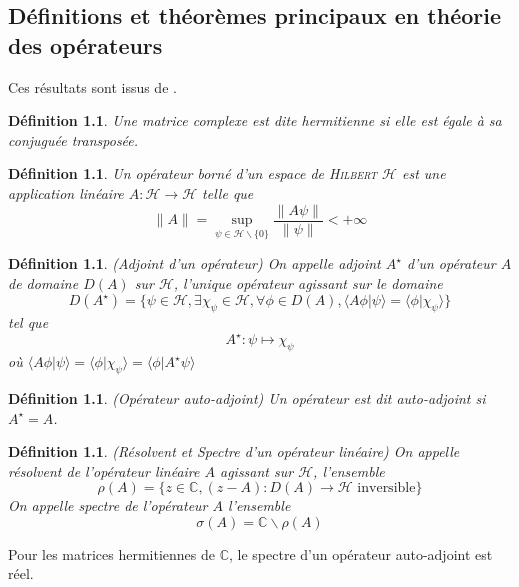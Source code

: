 \documentclass[svgnames,dvipsnames,a4paper,10pt,french]{report}
\newtheorem{definition}[theorem]{Définition}
\begin{document}
\begin{appendices}
\chapter{Définitions et théorèmes principaux en théorie des opérateurs}
\label{ann:def_th_op}


Ces résultats sont issus de \cite{cances_introduction_2021}.
\begin{definition}
Une matrice complexe est dite hermitienne si elle est égale à sa conjuguée transposée.
\end{definition}

\begin{definition}
Un opérateur borné d'un espace de \textsc{Hilbert} $\mathcal{H}$ est une application linéaire $A:\mathcal{H}\rightarrow\mathcal{H}$ telle que
\begin{equation}
\|A\| = \sup_{\psi\in\mathcal{H} \backslash  \{0\}} \frac{\|A\psi\|}{\|\psi\|} <+\infty
\end{equation}
\end{definition}

\begin{definition}{(Adjoint d'un opérateur)}
On appelle adjoint $A^\star$ d'un opérateur $A$ de domaine $D(A)$ sur $\mathcal{H}$, l'unique opérateur agissant  sur le domaine
\begin{equation}
    D(A^\star) = \{\psi\in\mathcal{H},\exists \chi_{\psi}\in\mathcal{H},\forall \phi \in D(A), \langle A\phi|\psi\rangle = \langle \phi|\chi_\psi\rangle \}
\end{equation}
tel que 
\begin{equation}
    A^\star:\psi \mapsto \chi_\psi
\end{equation}
où $\langle A\phi|\psi\rangle = \langle \phi|\chi_\psi\rangle = \langle \phi |A^\star \psi \rangle$
\end{definition}

\begin{definition}{(Opérateur auto-adjoint)}
Un opérateur est dit auto-adjoint si $A^\star =A$.
\end{definition}

\begin{definition}{(Résolvent et Spectre d'un opérateur linéaire)}
On appelle résolvent de l'opérateur linéaire $A$ agissant sur $\mathcal{H}$, l'ensemble
\begin{equation}
    \rho (A) = \{z\in\mathbb{C}, (z-A):D(A) \rightarrow \mathcal{H} \, \, \text{inversible}\}
\end{equation}
On appelle spectre de l'opérateur $A$ l'ensemble
\begin{equation}
    \sigma(A) =\mathbb{C} \backslash  \rho(A)
\end{equation}
\end{definition}
Pour les matrices hermitiennes de $\mathbb{C}$, le spectre d'un opérateur auto-adjoint est réel.


\end{appendices}
\end{document}
